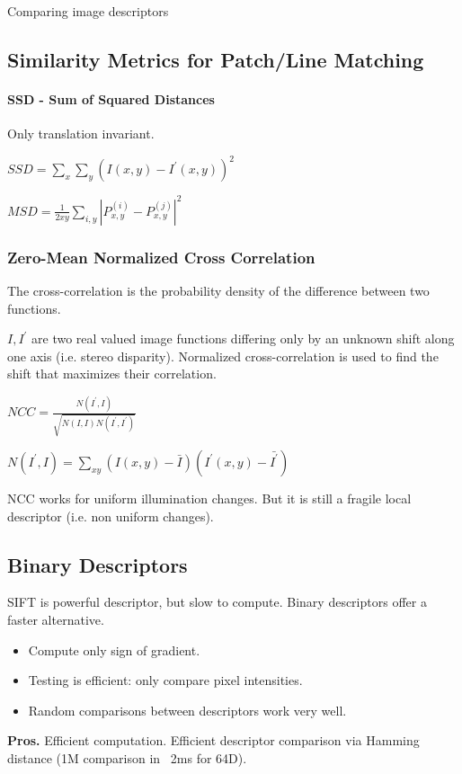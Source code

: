 Comparing image descriptors

\subsection{ Similarity Metrics for Patch/Line Matching}

\paragraph*{ SSD - Sum of Squared Distances} Only translation invariant.

$SSD = \sum_x \sum_y (I(x,y) - I^\prime(x,y))^2$

$MSD=\frac{1}{2xy} \sum_{i,y}\left|P_{x,y}^{(i)} - P^{(j)}_{x,y}\right|^2$

\subsubsection{Zero-Mean Normalized Cross Correlation}

The cross-correlation is the probability density of the difference between two functions.

$I,I^\prime$ are two real valued image functions differing only by an unknown shift along one axis (i.e. stereo disparity). Normalized cross-correlation is used to find the shift that maximizes their correlation.

$ NCC = \frac{N(I^\prime,I)}{\sqrt{N(I,I)N(I^\prime,I^\prime)}} $

$ N(I^\prime,I) = \sum_{xy} (I(x,y) - \bar I )(I^\prime(x,y) - \bar {I^\prime} ) $

NCC works for uniform illumination changes. But it is still a fragile local descriptor (i.e. non uniform changes). 

\subsection{Binary Descriptors}

SIFT is powerful descriptor, but slow to compute. Binary descriptors offer a faster alternative. 
\begin{itemize}
\item Compute only sign of gradient.
\item Testing is efficient: only compare pixel intensities.
\item Random comparisons between descriptors work very well.
\end{itemize}

\textbf{Pros.} Efficient computation. Efficient descriptor comparison via Hamming distance (1M comparison in ~2ms for 64D).

